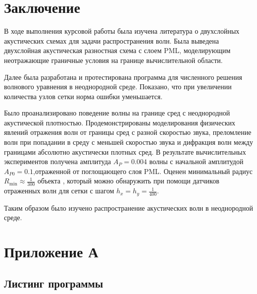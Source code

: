 \documentclass[a4paper, fontsize=14pt]{article}
\begin{document}
\clearpage

\section*{Заключение}

В ходе выполнения курсовой работы была изучена литература о двухслойных акустических схемах
для задачи распространения волн. Была выведена двухслойная акустическая разностная схема с
слоем PML, моделирующим неотражающие граничные условия на границе вычислительной области.

Далее была разработана и протестирована программа для численного решения волнового
уравнения в неоднородной среде. Показано, что при увеличении количества узлов сетки норма ошибки
уменьшается.

Было проанализировано поведение волны на границе сред с неоднородной
акустической плотностью. Продемонстрированы моделирования физических явлений отражения волн от
границы сред с разной скоростью звука, преломление волн при попадании в среду с меньшей скоростью
звука и дифракция волн между границами абсолютно акустически плотных сред. В результате
вычислительных экспериментов получена амплитуда $A_P = 0.004$ волны с начальной амплитудой $A_{P0} =
0.1$,отраженной от поглощающего слоя PML. Оценен минимальный радиус $R_\text{min} \approx \frac{1}{300}$ 
объекта , который можно обнаружить при помощи датчиков отраженных волн для сетки с шагом
$h_x = h_y = \frac{1}{400}$. 

Таким образом было изучено распространение акустических волн в неоднородной среде.

\newpage


\printbibliography

\newpage
\section*{Приложение А}
\subsection*{Листинг программы}










\end{document}
